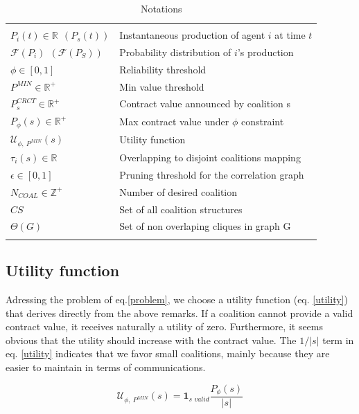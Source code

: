 \documentclass[conference]{IEEEtran}
\begin{document}
\begin{table}[t]
\centering
\scriptsize
\begin{tabular}{l|p{4.5cm}}
  \hline 
  \\
  $ P_{i}(t) \in \mathbb{R}\ \ (P_{s}(t)) $ & Instantaneous production of agent $i$ at time $t$ \\
  $ \mathcal{F}(P_{i})\ \ (\mathcal{F}(P_{S})) $ & Probability distribution of $i$'s production \\
  $ \phi \in [0,1] $ & Reliability threshold \\
  $ P^{MIN} \in \mathbb{R}^+ $ & Min value threshold \\
  $ P_{s}^{CRCT} \in \mathbb{R}^+ $ & Contract value announced by coalition s \\
  $ P_{\phi}(s) \in \mathbb{R}^+ $ & Max contract value under $ \phi $ constraint \\
  $ \mathcal{U}_{\phi,\ P^{MIN}}(s) $ & Utility function \\
  $ \tau_{i}(s) \in \mathbb{R}$ & Overlapping to disjoint coalitions mapping \\
  $ \epsilon \in [0,1] $ & Pruning threshold for the correlation graph \\
  $ N_{COAL} \in \mathbb{Z}^+ $ & Number of desired coalition \\
  $ CS $ & Set of all coalition structures \\
  $ \Theta(G) $ & Set of non overlaping cliques in graph G \\
  \\
  \hline
\end{tabular}

\caption{Notations\label{table1}}
\end{table}

\subsection{Utility function}\label{subsec:UtilityFunc}
Adressing the problem of eq.\ref{problem}, we choose a utility function (eq. \ref{utility}) that derives directly from the above remarks. If a coalition cannot provide a valid contract value, it receives naturally a utility of zero. Furthermore, it seems obvious that the utility should increase with the contract value. The $ 1/|s| $ term in eq. \ref{utility} indicates that we favor small coalitions, mainly because they are easier to maintain in terms of communications.

\begin{equation}
 \mathcal{U}_{\phi,\ P^{MIN}}(s) = \mathbf{1}_{\textit{s\ valid}} \dfrac{P_{\phi}(s)}{|s|} 
\label{utility}
\end{equation}
\end{document}

